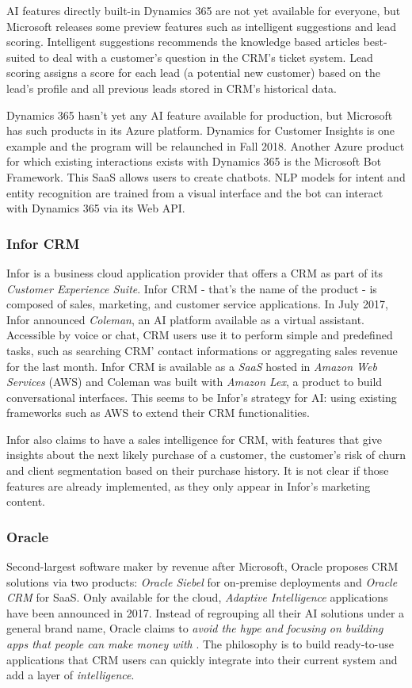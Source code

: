 AI features directly built-in Dynamics 365 are not yet available for everyone, but Microsoft releases some preview features such as intelligent suggestions and lead scoring. Intelligent suggestions recommends the knowledge based articles best-suited to deal with a customer's question in the CRM's ticket system. Lead scoring assigns a score for each lead (a potential new customer) based on the lead's profile and all previous leads stored in CRM's historical data.

Dynamics 365 hasn't yet any AI feature available for production, but Microsoft has such products in its Azure platform. Dynamics for Customer Insights is one example and the program will be relaunched in Fall 2018. Another Azure product for which existing interactions exists with Dynamics 365 is the Microsoft Bot Framework. This SaaS allows users to create chatbots. NLP models for intent and entity recognition are trained from a visual interface and the bot can interact with Dynamics 365 via its Web API.

\subsubsection*{Infor CRM}
Infor is a business cloud application provider that offers a CRM as part of its \textit{Customer Experience Suite}. Infor CRM - that's the name of the product - is composed of sales, marketing, and customer service applications. In July 2017, Infor announced \textit{Coleman}, an AI platform available as a virtual assistant. Accessible by voice or chat, CRM users use it to perform simple and predefined tasks, such as searching CRM' contact informations or aggregating sales revenue for the last month. Infor CRM is available as a \textit{SaaS} hosted in \textit{Amazon Web Services} (AWS) and Coleman was built with \textit{Amazon Lex}, a product to build conversational interfaces. This seems to be Infor's strategy for AI: using existing frameworks such as AWS to extend their CRM functionalities.

Infor also claims to have a sales intelligence for CRM, with features that give insights about the next likely purchase of a customer, the customer's risk of churn and client segmentation based on their purchase history. It is not clear if those features are already implemented, as they only appear in Infor's marketing content.\nocite{infor-website}


\subsubsection*{Oracle}
Second-largest software maker by revenue after Microsoft, Oracle proposes CRM solutions via two products: \textit{Oracle Siebel} for on-premise deployments and \textit{Oracle CRM} for SaaS. Only available for the cloud, \textit{Adaptive Intelligence} applications have been announced in 2017. Instead of regrouping all their AI solutions under a general brand name, Oracle claims to \textit{avoid the hype and focusing on building apps that people can make money with }\cite{crm-techmerge}. The philosophy is to build ready-to-use applications that CRM users can quickly integrate into their current system and add a layer of \textit{intelligence}.

